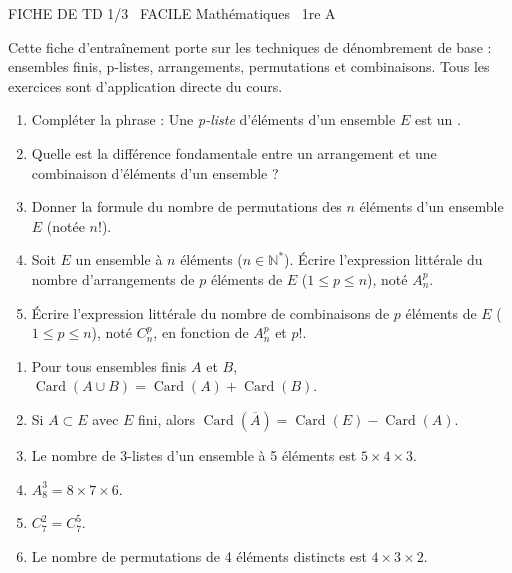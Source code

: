 \documentclass[11pt]{article}
\begin{document}
\begin{tcolorbox}[enhanced,colback=popink,colframe=popink,arc=10pt,boxrule=0pt,left=12pt,right=12pt,top=9pt,bottom=9pt]
{\color{white}\popxbold\small FICHE DE TD 1/3 \textbullet\ FACILE \hfill Mathématiques \textbullet\ 1re A\par}
\end{tcolorbox}
\vspace{4pt}
\noindent Cette fiche d'entraînement porte sur les techniques de dénombrement de base : ensembles finis, p-listes, arrangements, permutations et combinaisons. Tous les exercices sont d'application directe du cours.

\begin{exercice}
\begin{enumerate}
    \item Compléter la phrase : Une \textit{p-liste} d'éléments d'un ensemble $E$ est un \underline{\hspace{4cm}}.
    \item Quelle est la différence fondamentale entre un arrangement et une combinaison d'éléments d'un ensemble ?
    \item Donner la formule du nombre de permutations des $n$ éléments d'un ensemble $E$ (notée $n!$).
    \item Soit $E$ un ensemble à $n$ éléments ($n \in \mathbb{N}^*$). Écrire l'expression littérale du nombre d'arrangements de $p$ éléments de $E$ ($1 \leqslant p \leqslant n$), noté $A_n^p$.
    \item Écrire l'expression littérale du nombre de combinaisons de $p$ éléments de $E$ ($1 \leqslant p \leqslant n$), noté $C_n^p$, en fonction de $A_n^p$ et $p!$.
\end{enumerate}
\end{exercice}

\begin{exercice}
\begin{enumerate}
    \item Pour tous ensembles finis $A$ et $B$, $\operatorname{Card}(A \cup B) = \operatorname{Card}(A) + \operatorname{Card}(B)$.
    \item Si $A \subset E$ avec $E$ fini, alors $\operatorname{Card}(\overline{A}) = \operatorname{Card}(E) - \operatorname{Card}(A)$.
    \item Le nombre de 3-listes d'un ensemble à 5 éléments est $5 \times 4 \times 3$.
    \item $A_8^3 = 8 \times 7 \times 6$.
    \item $C_7^2 = C_7^5$.
    \item Le nombre de permutations de 4 éléments distincts est $4 \times 3 \times 2$.
\end{enumerate}
\end{exercice}
\end{document}
